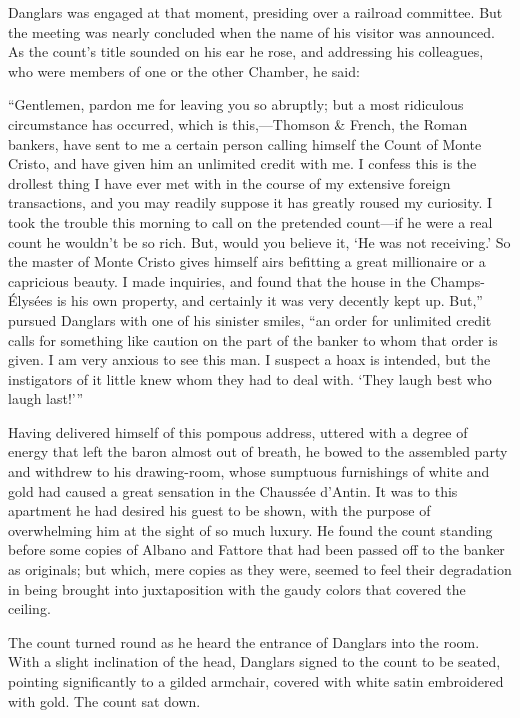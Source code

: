 Danglars was engaged at that moment, presiding over a railroad
committee. But the meeting was nearly concluded when the name of his
visitor was announced. As the count’s title sounded on his ear he rose,
and addressing his colleagues, who were members of one or the other
Chamber, he said:

“Gentlemen, pardon me for leaving you so abruptly; but a most
ridiculous circumstance has occurred, which is this,—Thomson \& French,
the Roman bankers, have sent to me a certain person calling himself the
Count of Monte Cristo, and have given him an unlimited credit with me.
I confess this is the drollest thing I have ever met with in the course
of my extensive foreign transactions, and you may readily suppose it
has greatly roused my curiosity. I took the trouble this morning to
call on the pretended count—if he were a real count he wouldn’t be so
rich. But, would you believe it, ‘He was not receiving.’ So the master
of Monte Cristo gives himself airs befitting a great millionaire or a
capricious beauty. I made inquiries, and found that the house in the
Champs-Élysées is his own property, and certainly it was very decently
kept up. But,” pursued Danglars with one of his sinister smiles, “an
order for unlimited credit calls for something like caution on the part
of the banker to whom that order is given. I am very anxious to see
this man. I suspect a hoax is intended, but the instigators of it
little knew whom they had to deal with. ‘They laugh best who laugh
last!’”

Having delivered himself of this pompous address, uttered with a degree
of energy that left the baron almost out of breath, he bowed to the
assembled party and withdrew to his drawing-room, whose sumptuous
furnishings of white and gold had caused a great sensation in the
Chaussée d’Antin. It was to this apartment he had desired his guest to
be shown, with the purpose of overwhelming him at the sight of so much
luxury. He found the count standing before some copies of Albano and
Fattore that had been passed off to the banker as originals; but which,
mere copies as they were, seemed to feel their degradation in being
brought into juxtaposition with the gaudy colors that covered the
ceiling.

The count turned round as he heard the entrance of Danglars into the
room. With a slight inclination of the head, Danglars signed to the
count to be seated, pointing significantly to a gilded armchair,
covered with white satin embroidered with gold. The count sat down.

